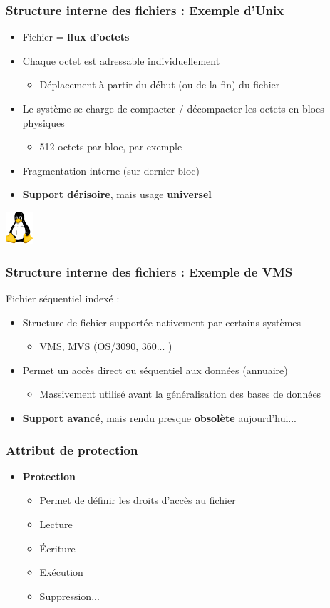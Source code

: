 \begin{frame}
\frametitle{Structure interne des fichiers : Exemple d'Unix}
\begin{itemize}
\item Fichier = \textbf{flux d'octets}
\item Chaque octet est adressable individuellement
\begin{itemize}
\item Déplacement à partir du début (ou de la fin) du fichier
\end{itemize}
\item Le système se charge de compacter / décompacter les octets en blocs physiques
\begin{itemize}
\item 512 octets par bloc, par exemple
\end{itemize}
\item Fragmentation interne (sur dernier bloc)
\item \textbf{Support dérisoire}, mais usage \textbf{universel}
\end{itemize}
\includegraphics[width=1cm]{../illustration/logo_tux.png}
\end{frame}

\begin{frame}
\frametitle{Structure interne des fichiers : Exemple de VMS}
Fichier séquentiel indexé :
\begin{itemize}
\item Structure de fichier supportée nativement par certains systèmes
\begin{itemize}
\item VMS, MVS (OS/3090, 360... )
\end{itemize}
\item Permet un accès direct ou séquentiel aux données (annuaire)
\begin{itemize}
\item Massivement utilisé avant la généralisation des bases de données
\end{itemize}
\item \textbf{Support avancé}, mais rendu presque \textbf{obsolète} aujourd'hui...
\end{itemize}
\end{frame}


\begin{frame}
\frametitle{Attribut de protection}
\begin{itemize}
\item \textbf{Protection}
\begin{itemize}
\item Permet de définir les droits d'accès au fichier
\item Lecture
\item Écriture
\item Exécution
\item Suppression...
\end{itemize}
\end{itemize}
\end{frame}


